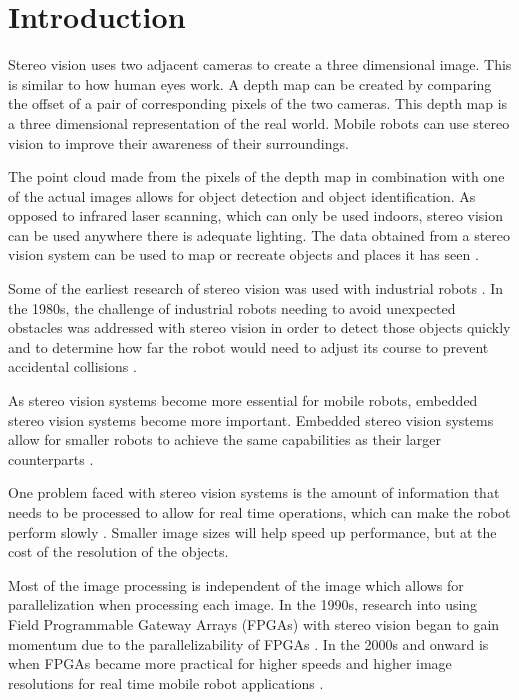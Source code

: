 \chapter{Introduction}
\label{sec:intro}

Stereo vision uses two adjacent cameras to create a three dimensional image. This is similar to how human eyes work. A depth map can be created by comparing the offset of a pair of corresponding pixels of the two cameras. This depth map is a three dimensional representation of the real world. Mobile robots can use stereo vision to improve their awareness of their surroundings.

The point cloud made from the pixels of the depth map in combination with one of the actual images allows for object detection and object identification. As opposed to infrared laser scanning, which can only be used indoors, stereo vision can be used anywhere there is adequate lighting. The data obtained from a stereo vision system can be used to map or recreate objects and places it has seen \cite{actStereoMap}.

Some of the earliest research of stereo vision was used with industrial robots \cite{industRobot}. In the 1980s, the challenge of industrial robots needing to avoid unexpected obstacles was addressed with stereo vision in order to detect those objects quickly and to determine how far the robot would need to adjust its course to prevent accidental collisions \cite{3DVision}.

As stereo vision systems become more essential for mobile robots, embedded stereo vision systems become more important. Embedded stereo vision systems allow for smaller robots to achieve the same capabilities as their larger counterparts \cite{xilinxSpartan3ABoard}.

One problem faced with stereo vision systems is the amount of information that needs to be processed to allow for real time operations, which can make the robot perform slowly \cite{nav}. Smaller image sizes will help speed up performance, but at the cost of the resolution of the objects. 

Most of the image processing is independent of the image which allows for parallelization when processing each image. In the 1990s, research into using Field Programmable Gateway Arrays (FPGAs) with stereo vision began to gain momentum due to the parallelizability of FPGAs \cite{stereoFPGA}. In the 2000s and onward is when FPGAs became more practical for higher speeds and higher image resolutions for real time mobile robot applications \cite{fpga}.

